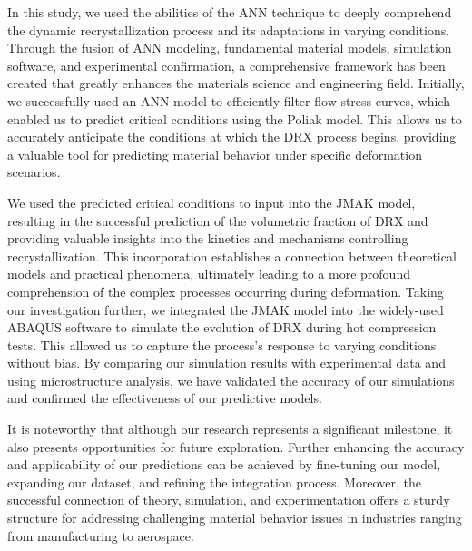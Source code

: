 \documentclass[metals,article,submit,pdftex,moreauthors]{Definitions/mdpi}
\begin{document}
In this study, we used the abilities of the ANN technique to deeply comprehend the dynamic recrystallization process and its adaptations in varying conditions.
Through the fusion of ANN modeling, fundamental material models, simulation software, and experimental confirmation, a comprehensive framework has been created that greatly enhances the materials science and engineering field.
Initially, we successfully used an ANN model to efficiently filter flow stress curves, which enabled us to predict critical conditions using the Poliak model.
This allows us to accurately anticipate the conditions at which the DRX process begins, providing a valuable tool for predicting material behavior under specific deformation scenarios.

We used the predicted critical conditions to input into the JMAK model, resulting in the successful prediction of the volumetric fraction of DRX and providing valuable insights into the kinetics and mechanisms controlling recrystallization.
This incorporation establishes a connection between theoretical models and practical phenomena, ultimately leading to a more profound comprehension of the complex processes occurring during deformation.
Taking our investigation further, we integrated the JMAK model into the widely-used ABAQUS software to simulate the evolution of DRX during hot compression tests. 
This allowed us to capture the process's response to varying conditions without bias.
By comparing our simulation results with experimental data and using microstructure analysis, we have validated the accuracy of our simulations and confirmed the effectiveness of our predictive models.

It is noteworthy that although our research represents a significant milestone, it also presents opportunities for future exploration.
Further enhancing the accuracy and applicability of our predictions can be achieved by fine-tuning our model, expanding our dataset, and refining the integration process.
Moreover, the successful connection of theory, simulation, and experimentation offers a sturdy structure for addressing challenging material behavior issues in industries ranging from manufacturing to aerospace.


\vspace{6pt}
\end{document}
